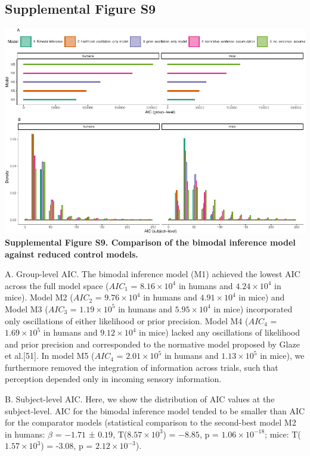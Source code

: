 \documentclass[
]{article}
\begin{document}
\newpage

\hypertarget{supplemental-figure-s9}{%
\subsection{Supplemental Figure S9}\label{supplemental-figure-s9}}

\includegraphics{modes_mouse_rev2_files/figure-latex/Supplemental_Figure_S9-1.pdf}
\textbf{Supplemental Figure S9. Comparison of the bimodal inference
model against reduced control models.}

A. Group-level AIC. The bimodal inference model (M1) achieved the lowest
AIC across the full model space (\(AIC_1\) =
\(\ensuremath{8.16\times 10^{4}}\) in humans and
\(\ensuremath{4.24\times 10^{4}}\) in mice). Model M2 (\(AIC_2\) =
\(\ensuremath{9.76\times 10^{4}}\) in humans and
\(\ensuremath{4.91\times 10^{4}}\) in mice) and Model M3 (\(AIC_3\) =
\(\ensuremath{1.19\times 10^{5}}\) in humans and
\(\ensuremath{5.95\times 10^{4}}\) in mice) incorporated only
oscillations of either likelihood or prior precision. Model M4
(\(AIC_4\) = \(\ensuremath{1.69\times 10^{5}}\) in humans and
\(\ensuremath{9.12\times 10^{4}}\) in mice) lacked any oscillations of
likelihood and prior precision and corresponded to the normative model
proposed by Glaze et al.{[}51{]}. In model M5 (\(AIC_4\) =
\(\ensuremath{2.01\times 10^{5}}\) in humans and
\(\ensuremath{1.13\times 10^{5}}\) in mice), we furthermore removed the
integration of information across trials, such that perception depended
only in incoming sensory information.

B. Subject-level AIC. Here, we show the distribution of AIC values at
the subject-level. AIC for the bimodal inference model tended to be
smaller than AIC for the comparator models (statistical comparison to
the second-best model M2 in humans: \(\beta\) = \(-1.71\) ± \(0.19\),
T(\(\ensuremath{8.57\times 10^{3}}\)) = \(-8.85\), p =
\(\ensuremath{1.06\times 10^{-18}}\); mice:
T(\(\ensuremath{1.57\times 10^{3}}\)) = -3.08, p =
\(\ensuremath{2.12\times 10^{-3}}\)).
\end{document}
